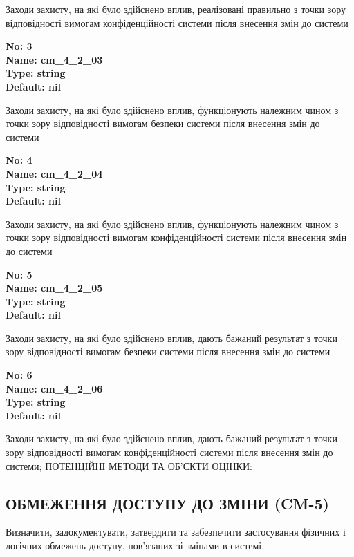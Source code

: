 \documentclass{article}
\begin{document}
{\footnotesize Заходи захисту, на які було здійснено вплив, реалізовані правильно з точки зору відповідності вимогам конфіденційності системи після внесення змін до системи}


{\footnotesize\bfseries
No: 3\\
Name: cm\_\allowbreak{}4\_\allowbreak{}2\_\allowbreak{}03\\
Type: string\\
Default: nil
}

{\footnotesize Заходи захисту, на які було здійснено вплив, функціонують належним чином з точки зору відповідності вимогам безпеки системи після внесення змін до системи}


{\footnotesize\bfseries
No: 4\\
Name: cm\_\allowbreak{}4\_\allowbreak{}2\_\allowbreak{}04\\
Type: string\\
Default: nil
}

{\footnotesize Заходи захисту, на які було здійснено вплив, функціонують належним чином з точки зору відповідності вимогам конфіденційності системи після внесення змін до системи}


{\footnotesize\bfseries
No: 5\\
Name: cm\_\allowbreak{}4\_\allowbreak{}2\_\allowbreak{}05\\
Type: string\\
Default: nil
}

{\footnotesize Заходи захисту, на які було здійснено вплив, дають бажаний результат з точки зору відповідності вимогам безпеки системи після внесення змін до системи}


{\footnotesize\bfseries
No: 6\\
Name: cm\_\allowbreak{}4\_\allowbreak{}2\_\allowbreak{}06\\
Type: string\\
Default: nil
}

{\footnotesize Заходи захисту, на які було здійснено вплив, дають бажаний результат з точки зору відповідності вимогам конфіденційності системи після внесення змін до системи; ПОТЕНЦІЙНІ МЕТОДИ ТА ОБ'ЄКТИ ОЦІНКИ:}




\subsection{ОБМЕЖЕННЯ ДОСТУПУ ДО ЗМІНИ (CM-5)}
Визначити, задокументувати, затвердити та забезпечити застосування фізичних і логічних обмежень доступу, пов'язаних зі змінами в системі.
\end{document}
